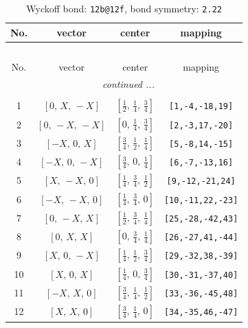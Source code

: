 \documentclass[fleqn,8pt]{jsarticle}
\begin{document}
\renewcommand{\arraystretch}{1.2}
\begin{longtable}{cccc}
\caption{Wyckoff bond: {\tt 12b@12f}, bond symmetry: {\tt 2.22}}
 \\
 \hline \hline
No. & vector & center & mapping \\ \hline \endfirsthead

\multicolumn{3}{l}{\tablename\ \thetable{}} \\
 \hline \hline
No. & vector & center & mapping \\ \hline \endhead

 \hline \hline
\multicolumn{3}{r}{\footnotesize\it continued ...} \\ \endfoot

 \hline \hline
\multicolumn{3}{r}{} \\ \endlastfoot

1 & $\left[ 0,\, X,\, - X \right]$ & $\left[ \frac{1}{2},\, \frac{1}{4},\, \frac{3}{4} \right]$ & {\tt [1,-4,-18,19]} \\ \hline
2 & $\left[ 0,\, - X,\, - X \right]$ & $\left[ 0,\, \frac{1}{4},\, \frac{3}{4} \right]$ & {\tt [2,-3,17,-20]} \\ \hline
3 & $\left[ - X,\, 0,\, X \right]$ & $\left[ \frac{3}{4},\, \frac{1}{2},\, \frac{1}{4} \right]$ & {\tt [5,-8,14,-15]} \\ \hline
4 & $\left[ - X,\, 0,\, - X \right]$ & $\left[ \frac{3}{4},\, 0,\, \frac{1}{4} \right]$ & {\tt [6,-7,-13,16]} \\ \hline
5 & $\left[ X,\, - X,\, 0 \right]$ & $\left[ \frac{1}{4},\, \frac{3}{4},\, \frac{1}{2} \right]$ & {\tt [9,-12,-21,24]} \\ \hline
6 & $\left[ - X,\, - X,\, 0 \right]$ & $\left[ \frac{1}{4},\, \frac{3}{4},\, 0 \right]$ & {\tt [10,-11,22,-23]} \\ \hline
7 & $\left[ 0,\, - X,\, X \right]$ & $\left[ \frac{1}{2},\, \frac{3}{4},\, \frac{1}{4} \right]$ & {\tt [25,-28,-42,43]} \\ \hline
8 & $\left[ 0,\, X,\, X \right]$ & $\left[ 0,\, \frac{3}{4},\, \frac{1}{4} \right]$ & {\tt [26,-27,41,-44]} \\ \hline
9 & $\left[ X,\, 0,\, - X \right]$ & $\left[ \frac{1}{4},\, \frac{1}{2},\, \frac{3}{4} \right]$ & {\tt [29,-32,38,-39]} \\ \hline
10 & $\left[ X,\, 0,\, X \right]$ & $\left[ \frac{1}{4},\, 0,\, \frac{3}{4} \right]$ & {\tt [30,-31,-37,40]} \\ \hline
11 & $\left[ - X,\, X,\, 0 \right]$ & $\left[ \frac{3}{4},\, \frac{1}{4},\, \frac{1}{2} \right]$ & {\tt [33,-36,-45,48]} \\ \hline
12 & $\left[ X,\, X,\, 0 \right]$ & $\left[ \frac{3}{4},\, \frac{1}{4},\, 0 \right]$ & {\tt [34,-35,46,-47]} \\
\end{longtable}
\end{document}
